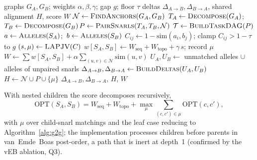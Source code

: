\begin{algorithm}[t]
\caption{PanG2G alignment (\textbf{depth-1 form}, as implemented and evaluated). Each snarl pair is an independent leaf solved by one $O(k^3)$ assignment. $W_{\text{seq}}=\alpha\cdot$ mean similarity of the two snarls' source and sink nodes; $W_{\text{topo}}=\beta\cdot\mathbf{1}[\text{both are simple bubbles}]$. The shared alignment $H$ (anchors, snarl pairs and their allele matchings) is written as a GAF-style alignment file, not materialized as a graph.}
\label{alg:g2g}
\begin{algorithmic}[1]
\Require graphs $G_A,G_B$; weights $\alpha,\beta,\gamma$; gap $g$; floor $\tau$
\Ensure deltas $\Delta_{A\to B},\Delta_{B\to A}$, shared alignment $H$, score $W$
\State $\mathcal{N}\gets \Call{FindAnchors}{G_A,G_B}$ 
\State $T_A\gets\Call{Decompose}{G_A}$;\ $T_B\gets\Call{Decompose}{G_B}$\State $P\gets\Call{PairSnarls}{T_A,T_B,\mathcal{N}}$ 
\State $\mathcal{T}\gets\Call{BuildTaskDAG}{P}$ 
   \State $a\gets\Call{Alleles}{S_A}$;\ $b\gets\Call{Alleles}{S_B}$
   \State $C_{ij}\gets 1-\mathrm{sim}(a_i,b_j)$; clamp $C_{ij}\!>\!1{-}\tau$ to $g$
   \State $(s,\mu)\gets\Call{LAPJV}{C}$ 
   \State $w[S_A,S_B]\gets W_{\text{seq}}+W_{\text{topo}}+\gamma\,s$; record $\mu$
\EndParFor
\State $W\gets\!\sum w[S_A,S_B]+\alpha\!\!\sum_{(u,v)\in\mathcal N}\!\!\mathrm{sim}(u,v)$
\State $U_A,U_B\gets$ unmatched alleles $\cup$ alleles of unpaired snarls
\State $\Delta_{A\to B},\Delta_{B\to A}\gets\Call{BuildDeltas}{U_A,U_B}$
\State $H\gets\mathcal{N}\cup P\cup\{\mu\}$ 
\State \Return $\Delta_{A\to B},\Delta_{B\to A}$, $H$, $W$
\end{algorithmic}
\end{algorithm}

With nested children the score decomposes recursively,
\begin{equation}
\mathrm{OPT}(S_A,S_B)=W_{\text{seq}}+W_{\text{topo}}+\max_{\mu}\sum_{(c,c')\in\mu}\mathrm{OPT}(c,c'),
\label{eq:dp}
\end{equation}
with $\mu$ over child-snarl matchings and the leaf case reducing to Algorithm~\ref{alg:g2g}; the implementation processes children before parents in van~Emde~Boas post-order, a path that is inert at depth~1 (confirmed by the vEB ablation, Q3).

